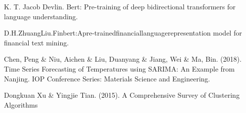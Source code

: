 \documentclass[12pt,a4paper, twoside]{article}
\begin{document}
\begin{thebibliography}{2}
 K. T. Jacob Devlin. Bert: Pre-training of deep bidirectional transformers for language understanding.

D.H.ZhuangLiu.Finbert:Apre-trainedfinanciallanguagerepresentation model for financial text mining.

Chen, Peng \& Niu, Aichen \& Liu, Duanyang \& Jiang, Wei \& Ma, Bin. (2018). Time Series Forecasting of Temperatures using SARIMA: An Example from Nanjing. IOP Conference Series: Materials Science and Engineering.

 Dongkuan Xu & Yingjie Tian. (2015). A Comprehensive Survey of Clustering Algorithms
\end{thebibliography}
\end{document}
